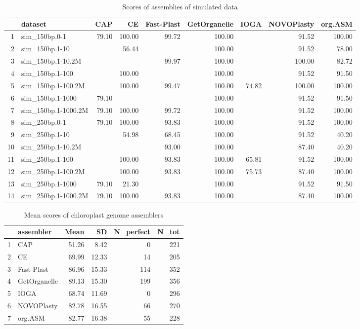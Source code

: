 \documentclass{bmcart}
\begin{document}
\begin{backmatter}
\begin{table}[ht]
\caption{Scores of assemblies of simulated data}
\label{tab:scores}
\centering
\begin{tabular}{rlrrrrrrr}
  \hline
 & dataset & CAP & CE & Fast-Plast & GetOrganelle & IOGA & NOVOPlasty & org.ASM \\ 
  \hline
1 & sim\_150bp.0-1 & 79.10 & 100.00 & 99.72 & 100.00 &  & 91.52 & 100.00 \\ 
  2 & sim\_150bp.1-10 &  & 56.44 &  & 100.00 &  & 91.52 & 78.00 \\ 
  3 & sim\_150bp.1-10.2M &  &  & 99.97 & 100.00 &  & 100.00 & 82.72 \\ 
  4 & sim\_150bp.1-100 &  & 100.00 &  & 100.00 &  & 91.52 & 91.50 \\ 
  5 & sim\_150bp.1-100.2M &  & 100.00 & 99.47 & 100.00 & 74.82 & 100.00 & 100.00 \\ 
  6 & sim\_150bp.1-1000 & 79.10 &  &  & 100.00 &  & 91.52 & 91.50 \\ 
  7 & sim\_150bp.1-1000.2M & 79.10 & 100.00 & 99.72 & 100.00 &  & 91.52 & 100.00 \\ 
  8 & sim\_250bp.0-1 & 79.10 & 100.00 & 93.83 & 100.00 &  & 91.52 & 100.00 \\ 
  9 & sim\_250bp.1-10 &  & 54.98 & 68.45 & 100.00 &  & 91.52 & 40.20 \\ 
  10 & sim\_250bp.1-10.2M &  &  & 93.00 & 100.00 &  & 87.40 & 40.20 \\ 
  11 & sim\_250bp.1-100 &  & 100.00 & 93.83 & 100.00 & 65.81 & 91.52 & 100.00 \\ 
  12 & sim\_250bp.1-100.2M &  & 100.00 & 93.83 & 100.00 & 75.73 & 87.40 & 100.00 \\ 
  13 & sim\_250bp.1-1000 & 79.10 & 21.30 &  & 100.00 &  & 91.52 & 91.50 \\ 
  14 & sim\_250bp.1-1000.2M & 79.10 & 100.00 & 93.83 & 100.00 &  & 87.40 & 100.00 \\ 
   \hline
\end{tabular}
\end{table}


\begin{table}[ht]
\caption{Mean scores of chloroplast genome assemblers}
\label{tab:scores}
\centering
\begin{tabular}{rlrrrr}
  \hline
 & assembler & Mean & SD & N\_perfect & N\_tot \\ 
  \hline
  1 & CAP & 51.26 & 8.42 &   0 & 221 \\ 
  2 & CE & 69.99 & 12.33 &  14 & 205 \\ 
  3 & Fast-Plast & 86.96 & 15.33 & 114 & 352 \\ 
  4 & GetOrganelle & 89.13 & 15.30 & 199 & 356 \\ 
  5 & IOGA & 68.74 & 11.69 &   0 & 296 \\ 
  6 & NOVOPlasty & 82.78 & 16.55 &  66 & 270 \\ 
  7 & org.ASM & 82.77 & 16.38 &  55 & 228 \\ 
   \hline
\end{tabular}
\end{table}




\end{backmatter}
\end{document}
